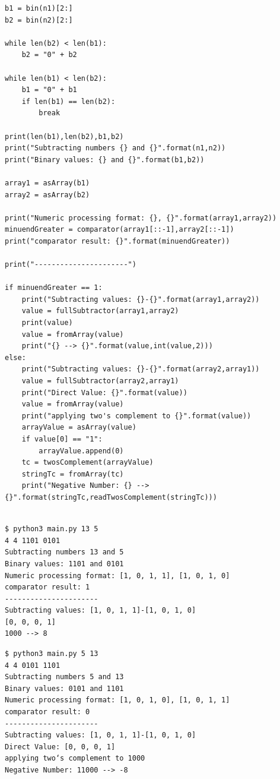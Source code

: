 \documentclass[oneside]{book}
\begin{document}
\begin{verbatim}
b1 = bin(n1)[2:]
b2 = bin(n2)[2:]

while len(b2) < len(b1):
    b2 = "0" + b2

while len(b1) < len(b2):
    b1 = "0" + b1
    if len(b1) == len(b2):
        break

print(len(b1),len(b2),b1,b2)
print("Subtracting numbers {} and {}".format(n1,n2))
print("Binary values: {} and {}".format(b1,b2))

array1 = asArray(b1)
array2 = asArray(b2)

print("Numeric processing format: {}, {}".format(array1,array2))
minuendGreater = comparator(array1[::-1],array2[::-1])
print("comparator result: {}".format(minuendGreater))

print("----------------------")

if minuendGreater == 1:
    print("Subtracting values: {}-{}".format(array1,array2))
    value = fullSubtractor(array1,array2)
    print(value)
    value = fromArray(value)
    print("{} --> {}".format(value,int(value,2)))
else:
    print("Subtracting values: {}-{}".format(array2,array1))
    value = fullSubtractor(array2,array1)
    print("Direct Value: {}".format(value))
    value = fromArray(value)
    print("applying two's complement to {}".format(value))
    arrayValue = asArray(value)
    if value[0] == "1":
        arrayValue.append(0)
    tc = twosComplement(arrayValue)
    stringTc = fromArray(tc)
    print("Negative Number: {} --> {}".format(stringTc,readTwosComplement(stringTc)))


\end{verbatim}
\clearpage
\begin{verbatim}
$ python3 main.py 13 5
4 4 1101 0101
Subtracting numbers 13 and 5
Binary values: 1101 and 0101
Numeric processing format: [1, 0, 1, 1], [1, 0, 1, 0]
comparator result: 1
----------------------
Subtracting values: [1, 0, 1, 1]-[1, 0, 1, 0]
[0, 0, 0, 1]
1000 --> 8
\end{verbatim}

\begin{verbatim}
$ python3 main.py 5 13
4 4 0101 1101
Subtracting numbers 5 and 13
Binary values: 0101 and 1101
Numeric processing format: [1, 0, 1, 0], [1, 0, 1, 1]
comparator result: 0
----------------------
Subtracting values: [1, 0, 1, 1]-[1, 0, 1, 0]
Direct Value: [0, 0, 0, 1]
applying two‘s complement to 1000
Negative Number: 11000 --> -8
\end{verbatim}
\clearpage


\end{document}
